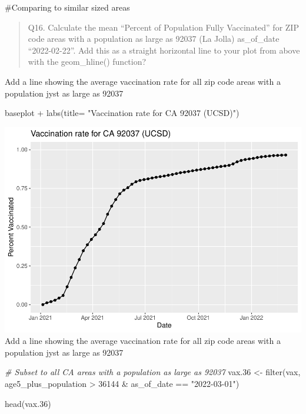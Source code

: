 \documentclass[
]{article}
\newenvironment{Shaded}{\begin{snugshade}}{\end{snugshade}}
\newcommand{\AttributeTok}[1]{\textcolor[rgb]{0.77,0.63,0.00}{#1}}
\newcommand{\CommentTok}[1]{\textcolor[rgb]{0.56,0.35,0.01}{\textit{#1}}}
\newcommand{\DecValTok}[1]{\textcolor[rgb]{0.00,0.00,0.81}{#1}}
\newcommand{\FloatTok}[1]{\textcolor[rgb]{0.00,0.00,0.81}{#1}}
\newcommand{\FunctionTok}[1]{\textcolor[rgb]{0.00,0.00,0.00}{#1}}
\newcommand{\NormalTok}[1]{#1}
\newcommand{\OtherTok}[1]{\textcolor[rgb]{0.56,0.35,0.01}{#1}}
\newcommand{\SpecialCharTok}[1]{\textcolor[rgb]{0.00,0.00,0.00}{#1}}
\newcommand{\StringTok}[1]{\textcolor[rgb]{0.31,0.60,0.02}{#1}}
\begin{document}
\#Comparing to similar sized areas

\begin{quote}
Q16. Calculate the mean ``Percent of Population Fully Vaccinated'' for
ZIP code areas with a population as large as 92037 (La Jolla)
as\_of\_date ``2022-02-22''. Add this as a straight horizontal line to
your plot from above with the geom\_hline() function?
\end{quote}

Add a line showing the average vaccination rate for all zip code areas
with a population jyst as large as 92037

\begin{Shaded}
\begin{Highlighting}[]
\NormalTok{baseplot }\SpecialCharTok{+} \FunctionTok{labs}\NormalTok{(}\AttributeTok{title=} \StringTok{"Vaccination rate for CA 92037 (UCSD)"}\NormalTok{)}
\end{Highlighting}
\end{Shaded}

\includegraphics{COVID19-Vax-mini-project_files/figure-latex/unnamed-chunk-30-1.pdf}
Add a line showing the average vaccination rate for all zip code areas
with a population jyst as large as 92037

\begin{Shaded}
\begin{Highlighting}[]
\CommentTok{\# Subset to all CA areas with a population as large as 92037}
\NormalTok{vax}\FloatTok{.36} \OtherTok{\textless{}{-}} \FunctionTok{filter}\NormalTok{(vax, age5\_plus\_population }\SpecialCharTok{\textgreater{}} \DecValTok{36144} \SpecialCharTok{\&}
\NormalTok{                as\_of\_date }\SpecialCharTok{==} \StringTok{"2022{-}03{-}01"}\NormalTok{)}

\FunctionTok{head}\NormalTok{(vax}\FloatTok{.36}\NormalTok{)}
\end{Highlighting}
\end{Shaded}
\end{document}
